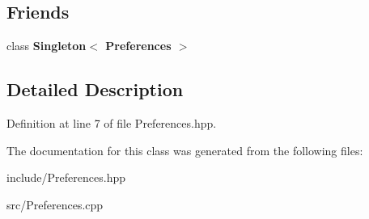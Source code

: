 \subsection*{Friends}
\begin{DoxyCompactItemize}
\item 
\hypertarget{class_preferences_a7537b923757df65b5e3e5d74a0308d4f}{}class {\bfseries Singleton$<$ Preferences $>$}\label{class_preferences_a7537b923757df65b5e3e5d74a0308d4f}

\end{DoxyCompactItemize}


\subsection{Detailed Description}


Definition at line 7 of file Preferences.\+hpp.



The documentation for this class was generated from the following files\+:\begin{DoxyCompactItemize}
\item 
include/Preferences.\+hpp\item 
src/Preferences.\+cpp\end{DoxyCompactItemize}
